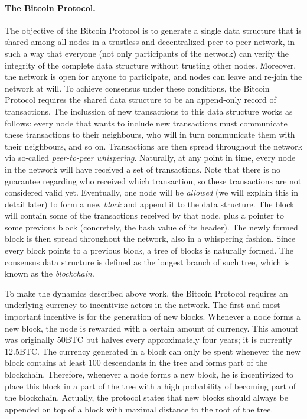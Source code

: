 \paragraph{\bf The Bitcoin Protocol.} The objective of the Bitcoin Protocol is to generate a single data structure that is shared among all nodes in a trustless and decentralized peer-to-peer network, in such a way that everyone (not only participants of the network) can verify the integrity of the complete data structure without trusting other nodes. Moreover, the network is open for anyone to participate, and nodes can leave and re-join the network at will. To achieve consensus under these conditions, the Bitcoin Protocol requires the shared data structure to be an append-only record of transactions. The inclussion of new transactions to this data structure works as follows: every node that wants to include new transactions must communicate these transactions to their neighbours, who will in turn communicate them with their neighbours, and so on. Transactions are then spread throughout the network via so-called \emph{peer-to-peer whispering}. Naturally, at any point in time, every node in the network will have received a set of transactions. Note that there is no guarantee regarding who received which transaction, so these transactions are not considered valid yet. Eventually, one node will be \emph{allowed} (we will explain this in detail later) to form a new \emph{block} and append it to the data structure. The block will contain some of the transactions received by that node, plus a pointer to some previous block (concretely, the hash value of its header). The newly formed block is then spread throughout the network, also in a whispering fashion. Since every block points to a previous block, a tree of blocks is naturally formed. The consensus data structure is defined as the longest branch of such tree, which is known as the \emph{blockchain}.

To make the dynamics described above work, the Bitcoin Protocol requires an underlying currency to incentivize actors in the network. The first and most important incentive is for the generation of new blocks. Whenever a node forms a new block, the node is rewarded with a certain amount of currency. This amount was originally 50BTC but halves every approximately four years; it is currently 12.5BTC. The currency generated in a block can only be spent whenever the new block contains at least 100 descendants in the tree and forms part of the blockchain. Therefore, whenever a node forms a new block, he is incentivized to place this block in a part of the tree with a high probability of becoming part of the blockchain. Actually, the protocol states that new blocks should always be appended on top of a block with maximal distance to the root of the tree.

